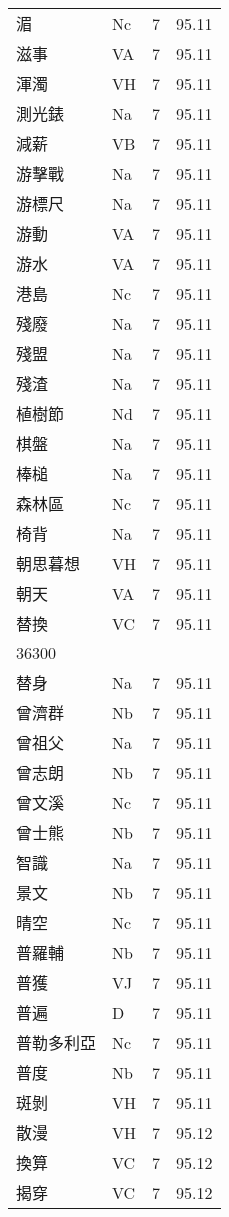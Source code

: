 \documentclass[twocolumn]{book}
\begin{document}
\begin{supertabular}{llrr}
湄 & Nc & 7 &  95.11\\
滋事 & VA & 7 &  95.11\\
渾濁 & VH & 7 &  95.11\\
測光錶 & Na & 7 &  95.11\\
減薪 & VB & 7 &  95.11\\
游擊戰 & Na & 7 &  95.11\\
游標尺 & Na & 7 &  95.11\\
游動 & VA & 7 &  95.11\\
游水 & VA & 7 &  95.11\\
港島 & Nc & 7 &  95.11\\
殘廢 & Na & 7 &  95.11\\
殘盟 & Na & 7 &  95.11\\
殘渣 & Na & 7 &  95.11\\
植樹節 & Nd & 7 &  95.11\\
棋盤 & Na & 7 &  95.11\\
棒槌 & Na & 7 &  95.11\\
森林區 & Nc & 7 &  95.11\\
椅背 & Na & 7 &  95.11\\
朝思暮想 & VH & 7 &  95.11\\
朝天 & VA & 7 &  95.11\\
替換 & VC & 7 &  95.11\\
36300\\
替身 & Na & 7 &  95.11\\
曾濟群 & Nb & 7 &  95.11\\
曾祖父 & Na & 7 &  95.11\\
曾志朗 & Nb & 7 &  95.11\\
曾文溪 & Nc & 7 &  95.11\\
曾士熊 & Nb & 7 &  95.11\\
智識 & Na & 7 &  95.11\\
景文 & Nb & 7 &  95.11\\
晴空 & Nc & 7 &  95.11\\
普羅輔 & Nb & 7 &  95.11\\
普獲 & VJ & 7 &  95.11\\
普遍 & D & 7 &  95.11\\
普勒多利亞 & Nc & 7 &  95.11\\
普度 & Nb & 7 &  95.11\\
斑剝 & VH & 7 &  95.11\\
散漫 & VH & 7 &  95.12\\
換算 & VC & 7 &  95.12\\
揭穿 & VC & 7 &  95.12\\

\end{supertabular}
\end{document}
